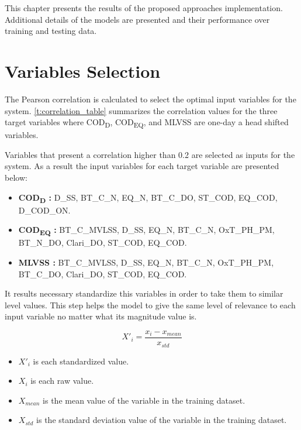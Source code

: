 This chapter presents the results of the proposed approaches implementation. Additional details of the models are presented and their performance over training and testing data. 

\section{Variables Selection}
\label{s:results_data_selection}

The Pearson correlation is calculated to select the optimal input variables for the system. \autoref{t:correlation_table} summarizes the correlation values for the three target variables where \ac{COD}\textsubscript{D}, \ac{COD}\textsubscript{EQ}, and \ac{MLVSS} are one-day a head shifted variables.



Variables that present a correlation higher than 0.2 are selected as inputs for the system. As a result the input variables for each target variable are presented below:

\begin{itemize}
    \item \textbf{COD\textsubscript{D} :} D\_SS, BT\_C\_N, EQ\_N, BT\_C\_DO, ST\_COD, EQ\_COD, D\_COD\_ON.
    \item \textbf{COD\textsubscript{EQ} :} BT\_C\_MVLSS, D\_SS, EQ\_N, BT\_C\_N, OxT\_PH\_PM, BT\_N\_DO, Clari\_DO, ST\_COD, EQ\_COD.
    \item \textbf{MLVSS :} BT\_C\_MVLSS, D\_SS, EQ\_N, BT\_C\_N, OxT\_PH\_PM, BT\_C\_DO, Clari\_DO, ST\_COD, EQ\_COD.
\end{itemize}

It results necessary standardize this variables in order to take them to similar level values. This step helps the model to give the same level of relevance to each input variable no matter what its magnitude value is.

\begin{equation}
    X'_i = \frac{x_i - x_{mean}}{x_{std}}
\end{equation}

\begin{itemize}
    \item \begin{math}X'_i\end{math} is each standardized value.
    \item \begin{math}X_i\end{math} is each raw value.
    \item \begin{math}X_{mean}\end{math} is the mean value of the variable in the training dataset.
    \item \begin{math}X_{std}\end{math} is the standard deviation value of the variable in the training dataset.
\end{itemize}


